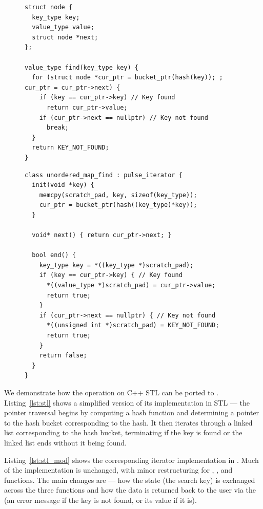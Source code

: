 \begin{figure}[t]
\centering
\begin{lstlisting}[caption={C++ STL realization for \code{unordered\_map::find()}.},label={lst:stl}]
struct node {
  key_type key;
  value_type value;
  struct node *next;
};

value_type find(key_type key) {
  for (struct node *cur_ptr = bucket_ptr(hash(key)); ; cur_ptr = cur_ptr->next) {
    if (key == cur_ptr->key) // Key found
      return cur_ptr->value;
    if (cur_ptr->next == nullptr) // Key not found
      break;
  }
  return KEY_NOT_FOUND;
}
\end{lstlisting}
\begin{lstlisting}[caption={\pulse realization for \code{unordered\_map::find()}.},label={lst:stl_mod}]
class unordered_map_find : pulse_iterator {
  init(void *key) {
    memcpy(scratch_pad, key, sizeof(key_type));
    cur_ptr = bucket_ptr(hash((key_type)*key));
  }
  
  void* next() { return cur_ptr->next; }
  
  bool end() {
    key_type key = *((key_type *)scratch_pad);
    if (key == cur_ptr->key) { // Key found
      *((value_type *)scratch_pad) = cur_ptr->value;
      return true;
    }
    if (cur_ptr->next == nullptr) { // Key not found
      *((unsigned int *)scratch_pad) = KEY_NOT_FOUND;  
      return true;
    }
    return false;
  }
}
\end{lstlisting}
\end{figure}

 We demonstrate how the  operation on C++ STL  can be ported to \pulse. Listing~\ref{lst:stl} shows a simplified version of its implementation in STL --- the pointer traversal begins by computing a hash function and determining a pointer to the hash bucket corresponding to the hash. It then iterates through a linked list corresponding to the hash bucket, terminating if the key is found or the linked list ends without it being found.

Listing~\ref{lst:stl_mod} shows the corresponding iterator implementation in \pulse. Much of the implementation is unchanged, with minor restructuring for , , and  functions. The main changes are --- how the state (the search key) is exchanged across the three functions and how the data is returned back to the user via the  (an error message if the key is not found, or its value if it is).   


